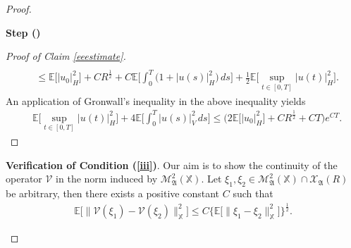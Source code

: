 \documentclass[english,a4paper,11pt]{amsart}
\theoremstyle{plain}
\theoremstyle{definition}
\theoremstyle{remark}
\numberwithin{equation}{section}
\newcounter{lil1}
\newenvironment{step}
{\begin{list} { \bf Step (\Roman{lil1})}
		{ \usecounter{lil1}
			\setlength{\leftmargin}{0.0cm}
			\setlength{\topsep}{0.2cm}
			\setlength{\itemsep}{0.0cm}
			\setlength{\parsep}{0.1cm}
			\setlength{\itemindent}{0.8cm}
			\setlength{\parskip}{0.0cm}}}
	{\end{list}}
\newcounter{lil33}
\newcounter{lil1q}
\newcommand{\MA}{\mathfrak{A}}
\newcommand{\EE}{ \mathbb{E} }
\newcommand{\Mcal} {{\mathcal M}}
\newcommand{\Vcal} {{\mathcal V}}
\newcommand{\Afrak} {{\mathfrak A}}
\newcommand{\X}{\mathbb{X}}
\begin{document}
\begin{proof}
\begin{step}
\begin{proof}[Proof of Claim \ref{eeestimate}]
\begin{align*}
	\\& \leq 
	\EE\big[ | u_0 | _H^2\big]+CR^\frac{1}{2}+C \EE\bigg[\int_0^T\big(1+ | u(s) | _{H}^2\big) \,ds\bigg] 
	+\frac{1}{2} \EE\bigg[\sup_{t\in[0,T]} | u(t) | _H^2\bigg].
\end{align*}An application of Gronwall's inequality in the above inequality yields
\begin{align*}
	&	\EE\bigg[\sup_{t\in[0,T]}	 | u(t) | _H^2\bigg]+4\EE\bigg[\int_0^T  | u(s) | _V^2\,ds\bigg] 
	\leq  
	\Big(2\EE\big[ | u_0 | _H^2\big]+CR^\frac{1}{2}+CT \Big)e^{CT} . 
\end{align*}
\end{proof}




\item 
\textbf{Verification of Condition (\ref{iii})}. Our aim is to show the continuity of the operator $\Vcal$ in the norm induced by $\Mcal_{\Afrak}^2(\X)$. Let $\xi_1,\xi_2\in \Mcal_{\Afrak}^2(\X)\cap \mathcal{X}_\MA(R)$ be arbitrary, then there exists a positive constant $C$ such that 
\begin{align}\label{conti}
	\EE\big[\|\Vcal(\xi_1)-\Vcal(\xi_2)\|_\X ^2\big] \leq C\Big\{\EE\big[\|\xi_1-\xi_2\|_\X^2\big]\Big\}^\frac{1}{2}.
\end{align}


\end{step}
\end{proof}
\end{document}
